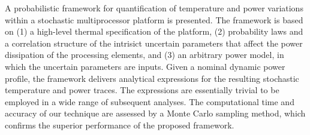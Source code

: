 A probabilistic framework for quantification of temperature and power variations within a stochastic multiprocessor platform is presented. The framework is based on (1) a high-level thermal specification of the platform, (2) probability laws and a correlation structure of the intrisict uncertain parameters that affect the power dissipation of the processing elements, and (3) an arbitrary power model, in which the uncertain parameters are inputs. Given a nominal dynamic power profile, the framework delivers analytical expressions for the resulting stochastic temperature and power traces. The expressions are essentially trivial to be employed in a wide range of subsequent analyses. The computational time and accuracy of our technique are assessed by a Monte Carlo sampling method, which confirms the superior performance of the proposed framework.
